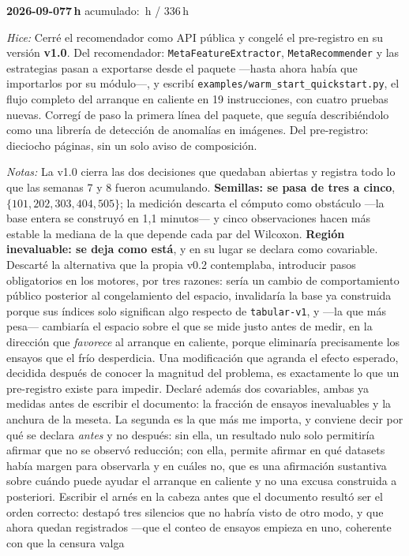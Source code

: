 \documentclass[11pt,letterpaper]{article}
\newcommand{\presupuesto}{336}
\newcommand{\horasacum}{0}
\newcommand{\entrada}[4]{%
  \xdef\horasacum{\fpeval{\horasacum + #2}}%
  \par\medskip
  \noindent\textbf{\color{tecnavy}#1}\quad\textbf{#2\,h}%
  \hfill{\small\color{gris}acumulado: \horasacum\,h / \presupuesto\,h}\par
  \nopagebreak
  \noindent\textit{Hice:} #3\par
  \nopagebreak
  \noindent\textit{Notas:} #4\par
}
\begin{document}
\entrada{2026-09-07}{7}
{Cerré el recomendador como API pública y congelé el pre-registro en su versión
 \textbf{v1.0}. Del recomendador: \texttt{MetaFeatureExtractor}, \texttt{MetaRecommender} y
 las estrategias pasan a exportarse desde el paquete —hasta ahora había que importarlos por
 su módulo—, y escribí \texttt{examples/\allowbreak warm\_start\_\allowbreak quickstart.py}, el flujo completo del
 arranque en caliente en 19 instrucciones, con cuatro pruebas nuevas. Corregí de paso la
 primera línea del paquete, que seguía describiéndolo como una librería de detección de
 anomalías en imágenes. Del pre-registro: dieciocho páginas, sin un solo aviso de
 composición.}
{La v1.0 cierra las dos decisiones que quedaban abiertas y registra todo lo que las semanas
 7 y 8 fueron acumulando. \textbf{Semillas: se pasa de tres a cinco}, $\{101, 202, 303, 404,
 505\}$; la medición descarta el cómputo como obstáculo —la base entera se construyó en 1,1
 minutos— y cinco observaciones hacen más estable la mediana de la que depende cada par del
 Wilcoxon. \textbf{Región inevaluable: se deja como está}, y en su lugar se declara como
 covariable. Descarté la alternativa que la propia v0.2 contemplaba, introducir pasos
 obligatorios en los motores, por tres razones: sería un cambio de comportamiento público
 posterior al congelamiento del espacio, invalidaría la base ya construida porque sus
 índices solo significan algo respecto de \texttt{tabular-v1}, y —la que más pesa— cambiaría
 el espacio sobre el que se mide justo antes de medir, en la dirección que \emph{favorece}
 al arranque en caliente, porque eliminaría precisamente los ensayos que el frío
 desperdicia. Una modificación que agranda el efecto esperado, decidida después de conocer
 la magnitud del problema, es exactamente lo que un pre-registro existe para impedir.
 Declaré además dos covariables, ambas ya medidas antes de escribir el documento: la
 fracción de ensayos inevaluables y la anchura de la meseta. La segunda es la que más me
 importa, y conviene decir por qué se declara \emph{antes} y no después: sin ella, un
 resultado nulo solo permitiría afirmar que no se observó reducción; con ella, permite
 afirmar en qué datasets había margen para observarla y en cuáles no, que es una afirmación
 sustantiva sobre cuándo puede ayudar el arranque en caliente y no una excusa construida a
 posteriori. Escribir el arnés en la cabeza antes que el documento resultó ser el orden
 correcto: destapó tres silencios que no habría visto de otro modo, y que ahora quedan
 registrados —que el conteo de ensayos empieza en uno, coherente con que la censura valga
}
\end{document}
